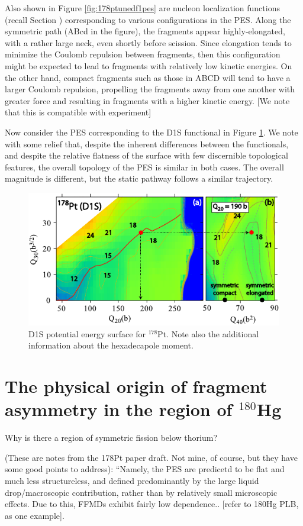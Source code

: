 Also shown in Figure \ref{fig:178ptunedf1pes} are nucleon localization functions (recall Section ) corresponding to various configurations in the PES. Along the symmetric path (ABcd in the figure), the fragments appear highly-elongated, with a rather large neck, even shortly before scission. Since elongation tends to minimize the Coulomb repulsion between fragments, then this configuration might be expected to lead to fragments with relatively low kinetic energies. On the other hand, compact fragments such as those in ABCD will tend to have a larger Coulomb repulsion, propelling the fragments away from one another with greater force and resulting in fragments with a higher kinetic energy. [We note that this is compatible with experiment]

Now consider the PES corresponding to the D1S functional in Figure \ref{fig:178ptd1spes}. We note with some relief that, despite the inherent differences between the functionals, and despite the relative flatness of the surface with few discernible topological features, the overall topology of the PES is similar in both cases. The overall magnitude is different, but the static pathway follows a similar trajectory.

\begin{figure}
	\centering
	\includegraphics[width=0.7\linewidth]{TeX_files/178Pt_D1S_pes}
	\caption[D1S potential energy surface for $^{178}$Pt]{D1S potential energy surface for $^{178}$Pt. Note also the additional information about the hexadecapole moment.}
	\label{fig:178ptd1spes}
\end{figure}



\section{The physical origin of fragment asymmetry in the region of $^{180}$Hg}

Why is there a region of symmetric fission below thorium?

(These are notes from the 178Pt paper draft. Not mine, of course, but they have some good points to address): ``Namely, the PES are predicetd to be flat and much less structureless, and defined predominantly by the large liquid drop/macroscopic contribution, rather than by relatively small microscopic effects. Due to this, FFMDs exhibit fairly low dependence..  [refer to 180Hg PLB, as one example].

